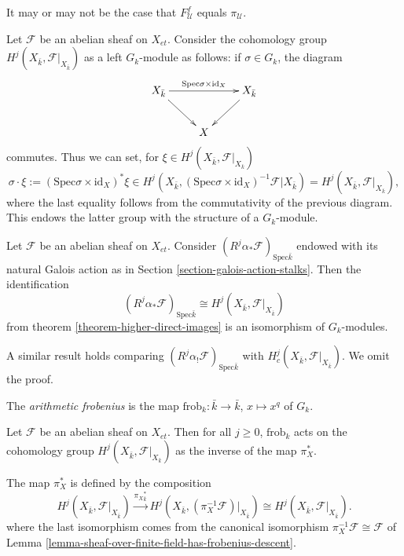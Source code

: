 \begin{remark}
\label{remark-may-be-confusing}
It may or may not be the case that $F^f_\mathcal{U}$ equals $\pi_\mathcal{U}$.
\end{remark}

\noindent
Let $\mathcal{F}$ be an abelian sheaf on $X_{et}$. Consider the cohomology
group $H^j (X_{\bar k}, \mathcal{F}|_{X_{\bar k}})$ as a left $G_k$-module as
follows: if $\sigma \in G_k$, the diagram
$$
\xymatrix{
X_{\bar k} \ar[rd] \ar^{\text{Spec} \sigma \times \text{id}_X}[rr] && X_{\bar
k} \ar[ld]\\
& X
}
$$
commutes. Thus we can set, for $\xi \in H^j (X_{\bar k}, \mathcal{F}|_{X_{\bar
k}})$
$$
\sigma \cdot \xi := (\text{Spec} \sigma \times \text{id}_X)^*\xi \in
H^j(X_{\bar k}, (\text{Spec} \sigma \times \text{id}_X)^{-1}
\mathcal{F}|{X_{\bar k}})
= H^j (X_{\bar k}, \mathcal{F}|_{X_{\bar k}}),
$$
where the last equality follows from the commutativity of the previous diagram.
This endows the latter group with the structure of a $G_k$-module.

\begin{lemma}
\label{lemma-two-actions-agree}
Let $\mathcal{F}$ be an abelian sheaf on $X_{et}$. Consider
$(R^j\alpha_*\mathcal{F})_{\text{Spec} \bar k}$ endowed with its natural Galois
action as in Section \ref{section-galois-action-stalks}. Then the
identification
$$
(R^j\alpha_*\mathcal{F})_{\text{Spec} \bar k} \cong H^j (X_{\bar k},
\mathcal{F}|_{X_{\bar k}})
$$
from theorem \ref{theorem-higher-direct-images} is an isomorphism of
$G_k$-modules.
\end{lemma}

A similar result holds comparing $(R^j\alpha_!\mathcal{F})_{\text{Spec} \bar
k}$ with $H^j_c (X_{\bar k}, \mathcal{F}|_{X_{\bar k}})$. We omit the proof.

\begin{definition}
\label{definition-arithmetic-frobenius}
The {\it arithmetic frobenius} is the map
$\text{frob}_k : \bar k \to \bar k$, $x \mapsto x^q$ of $G_k$.
\end{definition}

\begin{theorem}
\label{theorem-geometric-arithmetic-inverse}
Let $\mathcal{F}$ be an abelian sheaf on $X_{et}$. Then for all $j\geq 0$,
$\text{frob}_k$ acts on the cohomology group $H^j(X_{\bar k},
\mathcal{F}|_{X_{\bar k}})$ as the inverse of the map $\pi_X^*$.
\end{theorem}

\noindent
The map $\pi_X^*$ is defined by the composition
$$
H^j(X_{\bar k}, \mathcal{F}|_{X_{\bar k}}) \xrightarrow{{\pi_X}_{\bar k}^*}
H^j(X_{\bar k}, (\pi_X^{-1} \mathcal{F})|_{X_{\bar k}}) \cong
H^j(X_{\bar k}, \mathcal{F}|_{X_{\bar k}}).
$$
where the last isomorphism comes from the canonical isomorphism
$\pi_X^{-1} \mathcal{F} \cong \mathcal{F}$ of
Lemma \ref{lemma-sheaf-over-finite-field-has-frobenius-descent}.

